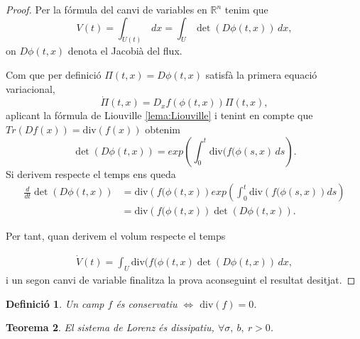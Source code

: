 \documentclass[11pt,a4paper,openright,oneside]{article}
\numberwithin{equation}{section}
\newtheorem{teo}{Teorema}[section]
\newtheorem{defi}[teo]{Definici\'o}
\theoremstyle{definition}
\begin{document}
\begin{proof} 
    Per la fórmula del canvi de variables en $\mathbb{R}^{n}$ tenim que \begin{equation*}
        V(t)=\int_{U(t)} \,dx=\int_{U}\det\left(D\phi(t,x)\right) \,dx,
    \end{equation*}
    on $D\phi(t,x)$ denota el Jacobià del flux. 
    
    Com que per definici\'{o} $\Pi(t,x)=D\phi(t,x)$ satisf\`{a} la primera equaci\'{o} variacional,
    \begin{equation*}
        \dot{\Pi}(t,x)=D_xf\left(\phi(t,x)\right)\Pi(t,x),
    \end{equation*}
    aplicant la fórmula de Liouville \eqref{lema:Liouville} i tenint en compte que $Tr(Df(x))=\text{div}(f(x))$ obtenim
    \begin{equation*}
        \det(D\phi(t,x))=exp\left(\int_{0}^{t} \text{div}(f(\phi(s,x) \,ds\right).
    \end{equation*}
    Si derivem respecte el temps ens queda
    \begin{equation*}\begin{split}
        \frac{d}{dt}\det(D\phi(t,x))&= \text{div}\left(f(\phi(t,x)\right)exp\left(\int_{0}^{t} \text{div}\left(f(\phi(s,x)\right) ds\right) \\ &=\text{div}\left(f(\phi(t,x)\right)\det\left(D\phi(t,x)\right).
    \end{split}\end{equation*}
    
    Per tant, quan derivem el volum respecte el temps 
    
    \begin{align*}
        \dot{V}(t)=\int_{U} \text{div}(f(\phi(t,x)\det(D\phi(t,x)) \,dx,
    \end{align*}
    i un segon canvi de variable finalitza la prova aconseguint el resultat desitjat.
\end{proof}

\begin{defi}
    Un camp $f$ és conservatiu $\iff$ $\text{div}(f)=0$.
\end{defi}

\begin{teo} \label{teo: dissipatiu}
    El sistema de Lorenz és dissipatiu, $\forall \sigma, \ b, \ r > 0$.
\end{teo}
\end{document}
